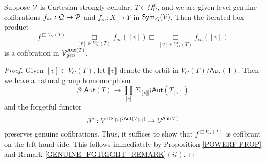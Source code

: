 \documentclass[a4paper,10pt]{article}%
\begin{document}
\begin{proposition}
\label{GENUINE_TREE_BOX_COFIBRANT_PROP} 
  Suppose $\V$ is Cartesian strongly cellular, $T\in \Omega_G^a$, and we are given level genuine cofibrations $f_{ac}: \mathcal Q \to \P$ and $f_{in}: X \to Y$ in $\Sym_G(\V)$. Then the iterated box product
  \[ 
  f^{\Box V_G(T)} = \mathop{\Box}\limits_{[v] \in V_G^{ac}(T)} f_{ac}([v]) \Box \mathop{\Box}\limits_{[v]\in V_G^{in}(T)}f_{in}([v]) 
  \] 
  is a cofibration in $\V^{\mathrm{Aut}(T)}_{gen}$.  
\end{proposition}
\begin{proof}
        Given $[v]\in V_G(T)$, let $\llbracket v \rrbracket$ denote the orbit in $V_G(T)/\mathsf{Aut(T)}$. Then we have a natural group homomorphism
        \[ 
        \beta: \mathsf{Aut}(T) \to \prod\limits_{\llbracket v \rrbracket} \Sigma_{|\llbracket v \rrbracket |} \wr \mathsf{Aut}(T_{[v]})
        \]
        and the forgetful functor 
        \[
        \beta^*: V^{\Pi \Sigma_{\llbracket v \rrbracket} \wr \mathsf{Aut}(T_{[v]})} \to \V^{\mathsf{Aut}(T)}
        \]
        preserves genuine cofibrations. Thus, it suffices to show that $f^{\Box V_G(T)}$ is cofibrant on the left hand side. This follows immediately by Proposition \ref{POWERF PROP} and Remark \ref{GENUINE_FGTRIGHT_REMARK}$(ii)$.




\end{proof}
\end{document}
